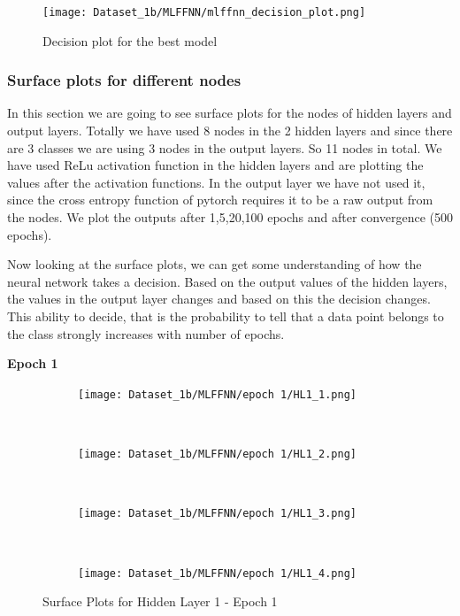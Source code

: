 \begin{figure}[!ht]
    \centering
    \texttt{[image: Dataset\_1b/MLFFNN/mlffnn\_decision\_plot.png]}
    \caption{Decision plot for the best model}
    \label{fig:14}
\end{figure}

\newpage

\subsubsection{Surface plots for different nodes}

In this section we are going to see surface plots for the nodes of hidden layers and output layers. Totally we have used 8 nodes in the 2 hidden layers and since there are 3 classes we are using 3 nodes in the output layers. So 11 nodes in total. We have used ReLu activation function in the hidden layers and are plotting the values after the activation functions. In the output layer we have not used it, since the cross entropy function of pytorch requires it to be a raw output from the nodes. We plot the outputs after 1,5,20,100 epochs and after convergence (500 epochs). 

Now looking at the surface plots, we can get some understanding of how the neural network takes a decision. Based on the output values of the hidden layers, the values in the output layer changes and based on this the decision changes. This ability to decide, that is the probability to tell that a data point belongs to the class strongly increases with number of epochs.

\textbf{Epoch 1}

\begin{figure}[!ht]
    \centering
    \begin{subfigure}[h]{0.5\textwidth}
        \centering
        \texttt{[image: Dataset\_1b/MLFFNN/epoch 1/HL1\_1.png]}
    \end{subfigure}%
    ~ 
    \begin{subfigure}[h]{0.5\textwidth}
        \centering
        \texttt{[image: Dataset\_1b/MLFFNN/epoch 1/HL1\_2.png]}
    \end{subfigure}%
    ~
    
    \begin{subfigure}[h]{0.4\textwidth}
        \centering
        \texttt{[image: Dataset\_1b/MLFFNN/epoch 1/HL1\_3.png]}
    \end{subfigure}
    ~
    \begin{subfigure}[h]{0.4\textwidth}
        \centering
        \texttt{[image: Dataset\_1b/MLFFNN/epoch 1/HL1\_4.png]}
    \end{subfigure}
    \caption{Surface Plots for Hidden Layer 1 - Epoch 1}
    \label{fig:13}
\end{figure}

